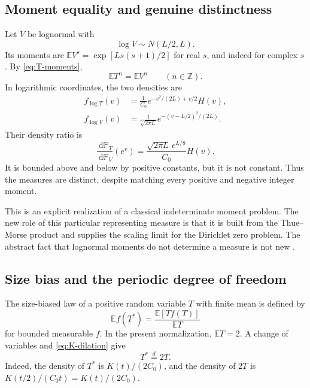 \documentclass[11pt,a4paper]{article}
\numberwithin{equation}{section}
\theoremstyle{definition}
\theoremstyle{remark}
\newcommand{\E}{\mathbb E}
\newcommand{\Z}{\mathbb Z}
\newcommand{\dd}{\,\mathrm d}
\begin{document}
\subsection{Moment equality and genuine distinctness}
Let $V$ be lognormal with
\begin{equation}
 \log V\sim N(L/2,L).
 \label{eq:lognormal}
\end{equation}
Its moments are
$\E V^s=\exp[Ls(s+1)/2]$ for real $s$, and indeed for complex $s$.
By \cref{eq:T-moments},
\begin{equation}
 \E T^n=\E V^n\qquad(n\in\Z).
 \label{eq:integer-twins}
\end{equation}
In logarithmic coordinates, the two densities are
\begin{align}
 f_{\log T}(v)
 &=\frac1{C_0}e^{-v^2/(2L)+v/2}H(v),
 \label{eq:T-log-density}\\
 f_{\log V}(v)
 &=\frac1{\sqrt{2\pi L}}e^{-(v-L/2)^2/(2L)}.
 \label{eq:V-log-density}
\end{align}
Their density ratio is
\begin{equation}
 \frac{\dd\mathbb P_T}{\dd\mathbb P_V}(e^v)
 =\frac{\sqrt{2\pi L}\,e^{L/8}}{C_0}H(v).
 \label{eq:density-ratio}
\end{equation}
It is bounded above and below by positive constants, but it is not
constant. Thus the measures are distinct, despite matching every
positive and negative integer moment.

This is an explicit realization of a classical indeterminate moment
problem. The new role of this particular representing measure is
that it is built from the Thue--Morse product and supplies the
scaling limit for the Dirichlet zero problem. The abstract fact that
lognormal moments do not determine a measure is not new
\cite[Section 9]{AGK}.

\subsection{Size bias and the periodic degree of freedom}
The size-biased law of a positive random variable $T$ with finite
mean is defined by
\[
 \E f(T^*)=\frac{\E[Tf(T)]}{\E T}
\]
for bounded measurable $f$. In the present normalization, $\E T=2$.
A change of variables and \cref{eq:K-dilation} give
\begin{equation}
 T^*\overset{d}=2T.
 \label{eq:size-bias}
\end{equation}
Indeed, the density of $T^*$ is $K(t)/(2C_0)$, and the density of
$2T$ is $K(t/2)/(C_0t)=K(t)/(2C_0)$.
\end{document}
